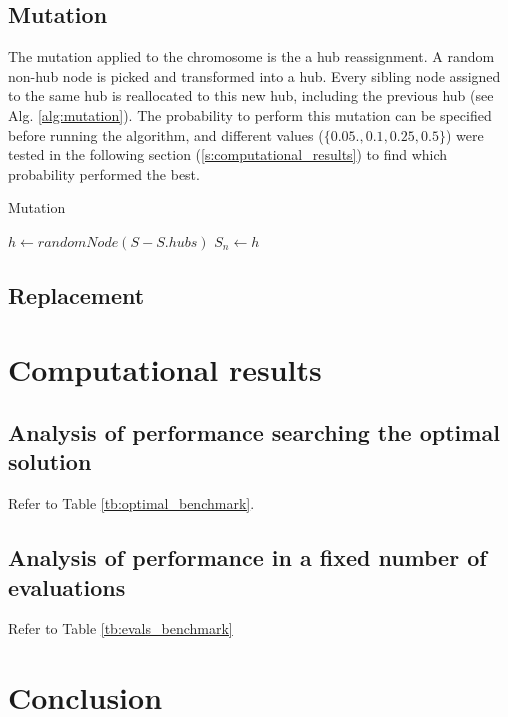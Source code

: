\documentclass[onecolumn]{IEEEtran}
\begin{document}
\subsection{Mutation\label{ss:mutation}}

The mutation applied to the chromosome is the a hub reassignment. A random non-hub node is
picked and transformed into a hub. Every sibling node assigned to the same hub is reallocated
to this new hub, including the previous hub (see Alg. \ref{alg:mutation}).
The probability to perform this mutation can be specified before running the algorithm,
and different values ($\{0.05., 0.1, 0.25, 0.5\}$) were tested in the following section 
(\ref{s:computational_results})
to find which probability performed the best.

\begin{algorithm}[H]
  \caption{Mutation}
  \label{alg:mutation}
  \begin{algorithmic}[1]
    \State $h \gets randomNode(S - S.hubs)$
        \State $S_{n} \gets h$
      \EndIf
    \EndFor
  \end{algorithmic}
\end{algorithm}

\subsection{Replacement}

\section{Computational results\label{s:computational_results}}

\subsection{Analysis of performance searching the optimal solution}

Refer to Table \ref{tb:optimal_benchmark}.



\subsection{Analysis of performance in a fixed number of evaluations}

Refer to Table \ref{tb:evals_benchmark}



\section{Conclusion}



\end{document}
